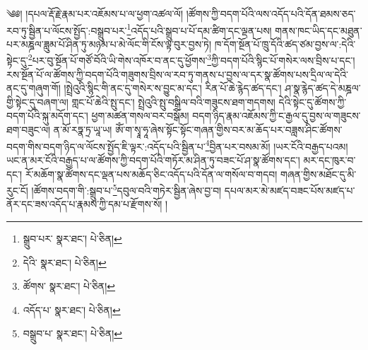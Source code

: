 \setcounter{footnote}{0} 
༄༅། །དཔལ་རྡོ་རྗེ་རྣམ་པར་འཇོམས་པ་ལ་ཕྱག་འཚལ་ལོ། །ཚོགས་ཀྱི་བདག་པོའི་ལས་འདོད་པའི་དོན་ཐམས་ཅད་རབ་ཏུ་སྦྱིན་པ་ལོངས་སྤྱོད་:བསྒྲུབ་པར་\footnote{སྒྲུབ་པར་  སྣར་ཐང་།  པེ་ཅིན། }འདོད་པའི་སྒྲུབ་པ་པོ་དམ་ཚིག་དང་ལྡན་པས། གནས་ཁང་ཡིད་དང་མཐུན་པར་མཎྜལ་ཟླུམ་པོ་ཤིན་ཏུ་མཉམ་པ་མེ་ལོང་གི་ངོས་ལྟ་བུར་བྱས་ཏེ། ཁ་དོག་སྔོན་པོ་ཁྲུ་དོའི་ཚད་ཙམ་བྱས་ལ་:དེའི་སྟེང་དུ་\footnote{དེའི་  སྣར་ཐང་།  པེ་ཅིན། }པར་བུ་སྔོན་པོ་གཙོ་བོའི་ཡི་གེས་འཁོར་བ་ནང་དུ་ཕྱོགས་\footnote{ཚོགས་  སྣར་ཐང་།  པེ་ཅིན། }ཀྱི་བདག་པོའི་སྙིང་པོ་གསེར་ལས་བྲིས་པ་དང་། རས་སྔོན་པོ་ལ་ཚོགས་ཀྱི་བདག་པོའི་གཟུགས་བྲིས་ལ་རབ་ཏུ་གནས་པ་བྱས་ལ་དར་སྣ་ཚོགས་པས་དྲིལ་ལ་དེའི་ནང་དུ་གཞུག་གོ། །སྤྲེའུའི་སྙིང་གི་ནང་དུ་གསེར་ས་བྱུང་མ་དང་། རིན་པོ་ཆེ་རྙེད་ཚད་དང་། ཤ་སྣ་རྙེད་ཚད་དེ་མཎྜལ་གྱི་སྟེང་དུ་བཞག་ལ། གླང་པོ་ཆེའི་སྤུ་དང་། སྤྲེའུའི་སྤུ་བསྒྲིལ་བའི་གཟུངས་ཐག་གདགས། དེའི་སྟེང་དུ་ཚོགས་ཀྱི་བདག་པོའི་སྐུ་མདོག་དང་། ཕྱག་མཚན་གསལ་བར་བསྒོམ། བདག་ཉིད་རྣམ་འཇོམས་ཀྱི་ང་རྒྱལ་དུ་བྱས་ལ་གཟུངས་ཐག་བཟུང་ལ། ན་མོ་རཏྣ་ཏྲ་ཡཱ་ཡ། ཨོཾ་ག་སྭཱ་ཧཱ་ཞེས་སྟོང་སྟོང་གཞན་གྱིས་བར་མ་ཆོད་པར་བཟླས་ཤིང་ཚོགས་བདག་གིས་བདག་ཉིད་ལ་ལོངས་སྤྱོད་ཇི་ལྟར་:འདོད་པའི་སྦྱིན་པ་\footnote{འདོད་པ་  སྣར་ཐང་།  པེ་ཅིན། }བྱིན་པར་བསམ་མོ། །ཡར་ངོའི་བརྒྱད་པའམ། ཡང་ན་མར་ངོའི་བརྒྱད་པ་ལ་ཚོགས་ཀྱི་བདག་པོའི་གཏོར་མ་ཤིན་ཏུ་བཟང་པོ་ཤ་སྣ་ཚོགས་དང་། མར་དང་ཁུར་བ་དང་། རོ་མཆོག་སྣ་ཚོགས་དང་ལྡན་པས་མཆོད་ཅིང་འདོད་པའི་དོན་ལ་གསོལ་བ་གདབ། གཞན་གྱིས་མཐོང་དུ་མི་རུང་ངོ། །ཚོགས་བདག་གི་:སྒྲུབ་པ་\footnote{བསྒྲུབ་པ་  སྣར་ཐང་།  པེ་ཅིན། }དབུལ་བའི་གཏེར་སྦྱིན་ཞེས་བྱ་བ། དཔལ་མར་མེ་མཛད་བཟང་པོས་མཛད་པ་ནོར་དང་ཟས་འདོད་པ་རྣམས་ཀྱི་དམ་པ་རྫོགས་སོ། ། 